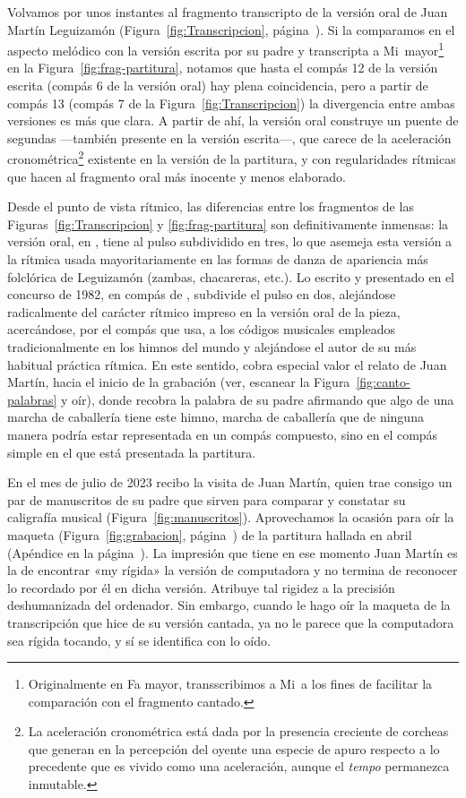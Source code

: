 Volvamos por unos instantes al fragmento transcripto de la versión oral de Juan Martín Leguizamón (Figura~\ref{fig:Transcripcion}, página~\pageref{fig:Transcripcion}). Si la comparamos en el aspecto melódico con la versión escrita por su padre y transcripta a Mi\bemoltxt\ mayor\footnote{Originalmente en Fa mayor, transscribimos a Mi\bemoltxt\ a los fines de facilitar la comparación con el fragmento cantado.} en la Figura~\ref{fig:frag-partitura}, notamos que hasta el compás 12 de la versión escrita (compás 6 de la versión oral) hay plena coincidencia, pero a partir de compás 13 (compás 7 de la Figura~\ref{fig:Transcripcion}) la divergencia entre ambas versiones es más que clara. A partir de ahí, la versión oral construye un puente de segundas  ---también presente en la versión escrita---, que carece de la aceleración cronométrica\footnote{La aceleración cronométrica está dada por la presencia creciente de corcheas que generan en la percepción del oyente una especie de apuro respecto a lo precedente que es vivido como una aceleración, aunque el \emph{tempo} permanezca inmutable.} existente en la versión de la partitura, y con regularidades rítmicas que hacen al fragmento oral más inocente y menos elaborado.

Desde el punto de vista rítmico, las diferencias entre los fragmentos de las Figuras~\ref{fig:Transcripcion} y \ref{fig:frag-partitura} son definitivamente inmensas: la versión oral, en , tiene al pulso subdividido en tres, lo que asemeja esta versión a la rítmica usada mayoritariamente en las formas de danza de apariencia más folclórica de Leguizamón (zambas, chacareras, etc.). Lo escrito y presentado en el concurso de 1982, en compás de , subdivide el pulso en dos, alejándose radicalmente del carácter rítmico impreso en la versión oral de la pieza, acercándose, por el compás que usa, a los códigos musicales empleados tradicionalmente en los himnos del mundo y alejándose el autor de su más habitual práctica rítmica. En este sentido, cobra especial valor el relato de Juan Martín, hacia el inicio de la grabación (ver, escanear la Figura~\ref{fig:canto-palabras} y oír), donde recobra la palabra de su padre afirmando que algo de una marcha de caballería tiene este himno, marcha de caballería que de ninguna manera podría estar representada en un compás compuesto, sino en el compás simple en el que está presentada la partitura.

En el mes de julio de 2023 recibo la visita de Juan Martín, quien trae consigo un par de manuscritos de su padre que sirven para comparar y constatar su caligrafía musical (Figura~\ref{fig:manuscritos}). Aprovechamos la ocasión para oír la maqueta (Figura~\ref{fig:grabacion}, página~\pageref{fig:grabacion}) de la partitura hallada en abril (Apéndice en la página~\pageref{apx:partitura}). La impresión que tiene en ese momento Juan Martín es la de encontrar «my rígida» la versión de computadora y no termina de reconocer lo recordado por él en dicha versión. Atribuye tal rigidez a la precisión deshumanizada del ordenador. Sin embargo, cuando le hago oír la maqueta de la transcripción que hice de su versión cantada, ya no le parece que la computadora sea rígida tocando, y sí se identifica con lo oído.

